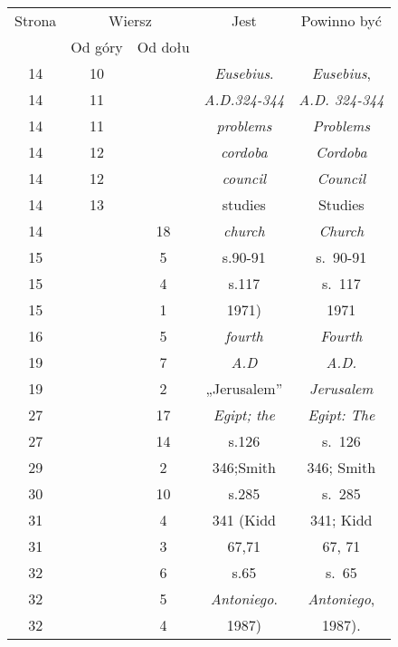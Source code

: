 \documentclass[a4paper,11pt]{article}
\begin{document}
\begin{center}

  \begin{tabular}{|c|c|c|c|c|}
    \hline
    Strona & \multicolumn{2}{c|}{Wiersz} & Jest
                              & Powinno być \\ \cline{2-3}
    & Od góry & Od dołu & & \\
    \hline
    \hphantom{0}14 & 10 & & \textit{Eusebius}. & \textit{Eusebius}, \\
    \hphantom{0}14 & 11 & & \textit{A.D.324-344} & \textit{A.D. 324-344} \\
    \hphantom{0}14 & 11 & & \textit{problems} & \textit{Problems} \\
    \hphantom{0}14 & 12 & & \textit{cordoba} & \textit{Cordoba} \\
    \hphantom{0}14 & 12 & & \textit{council} & \textit{Council} \\
    \hphantom{0}14 & 13 & & studies & Studies \\
    \hphantom{0}14 & & 18 & \textit{church} & \textit{Church} \\
    \hphantom{0}15 & & \hphantom{0}5 & s.90-91 & s.~90-91 \\
    \hphantom{0}15 & & \hphantom{0}4 & s.117 & s.~117 \\
    \hphantom{0}15 & & \hphantom{0}1 & 1971) & 1971 \\
    \hphantom{0}16 & & \hphantom{0}5 & \textit{fourth} & \textit{Fourth} \\
    \hphantom{0}19 & & \hphantom{0}7 & \textit{A.D} & \textit{A.D.} \\
    \hphantom{0}19 & & \hphantom{0}2 & „Jerusalem” & \textit{Jerusalem} \\
    \hphantom{0}27 & & 17 & \textit{Egipt; the} & \textit{Egipt: The} \\
    \hphantom{0}27 & & 14 & s.126 & s.~126 \\
    \hphantom{0}29 & & \hphantom{0}2 & 346;Smith & 346; Smith\\
    \hphantom{0}30 & & 10 & s.285 & s.~285 \\
    \hphantom{0}31 & & \hphantom{0}4 & 341 (Kidd & 341; Kidd \\
    \hphantom{0}31 & & \hphantom{0}3 & 67,71 & 67, 71 \\
    \hphantom{0}32 & & \hphantom{0}6 & s.65 & s.~65 \\
    \hphantom{0}32 & & \hphantom{0}5 & \textit{Antoniego}.
    & \textit{Antoniego}, \\
    \hphantom{0}32 & & \hphantom{0}4 & 1987) & 1987). \\

\end{tabular}
\end{center}
\end{document}
